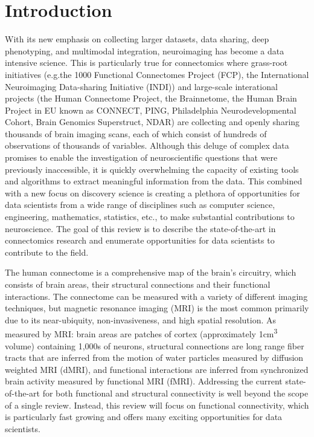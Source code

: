\section{Introduction}

With its new emphasis on collecting larger datasets, data sharing, deep phenotyping, and multimodal integration, neuroimaging has become a data intensive science. This is particularly true for connectomics where grass-root initiatives (e.g.the 1000 Functional Connectomes Project (FCP)\cite{Biswal2010}, the International Neuroimaging Data-sharing Initiative (INDI)\cite{Mennes2013}) and large-scale interational projects (the Human Connectome Project\cite{Sotiropoulus2013,VanEssen2012}, the Brainnetome\cite{Jiang2013}, the Human Brain Project in EU known as CONNECT\cite{Assaf2013}, PING, Philadelphia Neurodevelopmental Cohort,  Brain Genomics Superstruct, NDAR) are collecting and openly sharing thousands of brain imaging scans, each of which consist of hundreds of observations of thousands of variables. Although this deluge of complex data promises to enable the investigation of neuroscientific questions that were previously inaccessible, it is quickly overwhelming the capacity of existing tools and algorithms to extract meaningful information from the data. This combined with a new focus on discovery science is creating a plethora of opportunities for data scientists from a wide range of disciplines such as computer science, engineering, mathematics, statistics, etc., to make substantial contributions to neuroscience. The goal of this review is to describe the state-of-the-art in connectomics research and enumerate opportunities for data scientists to contribute to the field.

The human connectome is a comprehensive map of the brain's circuitry, which consists of brain areas, their structural connections and their functional interactions. The connectome can be measured with a variety of different imaging techniques, but magnetic resonance imaging (MRI) is the most common primarily due to its near-ubiquity, non-invasiveness, and high spatial resolution. As measured by MRI: brain areas are patches of cortex (approximately 1\si{\centi\meter\cubed} volume) containing 1,000s of neurons, structural connections are long range fiber tracts that are inferred from the motion of water particles measured by diffusion weighted MRI (dMRI), and functional interactions are inferred from synchronized brain activity measured by functional MRI (fMRI). Addressing the current state-of-the-art for both functional and structural connectivity is well beyond the scope of a single review. Instead, this review will focus on functional connectivity, which is particularly fast growing and offers many exciting opportunities for data scientists.

